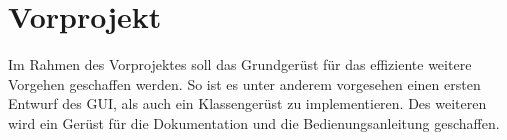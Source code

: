 \chapter{Vorprojekt}

Im Rahmen des Vorprojektes soll das Grundgerüst für das effiziente weitere Vorgehen geschaffen werden. 
So ist es unter anderem vorgesehen einen ersten Entwurf des GUI, als auch ein Klassengerüst zu implementieren.
Des weiteren wird ein Gerüst für die Dokumentation und die Bedienungsanleitung geschaffen. 